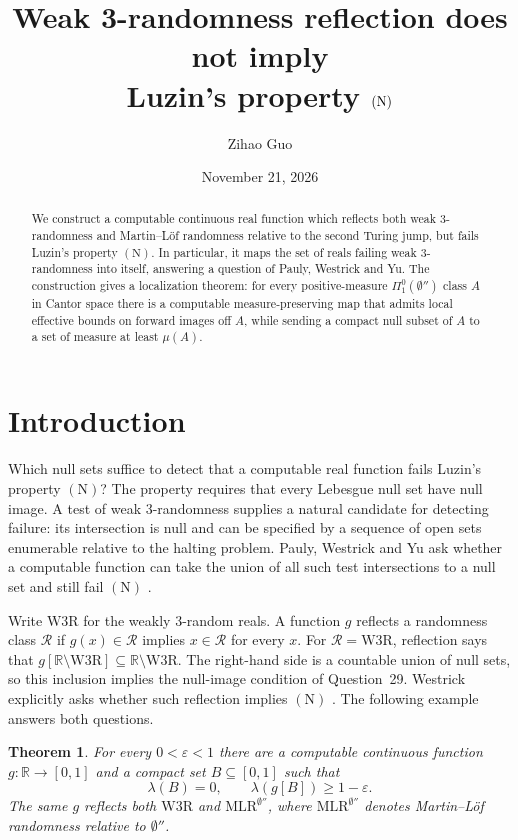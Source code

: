 \documentclass[12pt,reqno]{amsart}
\title[Weak 3-randomness reflection and Luzin's (N)]{Weak 3-randomness reflection does not imply\\ Luzin's property \texorpdfstring{$\Nprop$}{(N)}}
\author{Zihao Guo}
\date{November 21, 2026}
\newtheorem{theorem}{Theorem}[section]
\newcommand{\WThree}{\mathrm{W3R}}
\newcommand{\MLR}{\mathrm{MLR}}
\newcommand{\Nprop}{\mathrm{(N)}}
\newcommand{\RR}{\mathbb R}
\newcommand{\mass}{\mu}
\newcommand{\lebesgue}{\lambda}
\newcommand{\eps}{\varepsilon}
\newcommand{\djump}{\emptyset''}
\begin{document}
\begin{abstract}
We construct a computable continuous real function which reflects both
weak 3-randomness and Martin--L\"of randomness relative to the second
Turing jump, but fails Luzin's property $\Nprop$. In particular, it maps
the set of reals failing weak 3-randomness into itself, answering a question
of Pauly, Westrick and Yu. The construction gives a localization theorem:
for every positive-measure $\Pi^0_1(\djump)$ class $A$ in Cantor space
there is a computable measure-preserving map that admits local effective
bounds on forward images off $A$, while sending a compact null subset
of $A$ to a set of measure at least $\mass(A)$.

\end{abstract}
\maketitle

\section{Introduction}

Which null sets suffice to detect that a computable real function fails
Luzin's property $\Nprop$? The property requires that every Lebesgue
null set have null image. A test of weak 3-randomness supplies a natural
candidate for detecting failure: its intersection is null and can be
specified by a sequence of open sets enumerable relative to the halting
problem. Pauly, Westrick and Yu ask whether a computable function can
take the union of all such test intersections to a null set and still
fail $\Nprop$ \cite[\S3.4, Open Question~29]{PWY}.

Write $\WThree$ for the weakly 3-random reals. A function $g$ reflects
a randomness class $\mathcal R$ if $g(x)\in\mathcal R$ implies
$x\in\mathcal R$ for every $x$. For $\mathcal R=\WThree$, reflection
says that $g[\RR\setminus\WThree]\subseteq\RR\setminus\WThree$.
The right-hand side is a countable union of null sets, so this inclusion
implies the null-image condition of Question~29. Westrick explicitly
asks whether such reflection implies $\Nprop$ \cite[slide~9]{W}.
The following example answers both questions.

\begin{theorem}\label{thm:main}
For every $0<\eps<1$ there are a computable continuous function
$g:\RR\to[0,1]$ and a compact set $B\subseteq[0,1]$ such that
\[
   \lebesgue(B)=0,\qquad \lebesgue(g[B])\ge 1-\eps .
\]
The same $g$ reflects both $\WThree$ and $\MLR^{\djump}$, where
$\MLR^{\djump}$ denotes Martin--L\"of randomness relative to $\djump$.
\end{theorem}
\end{document}
